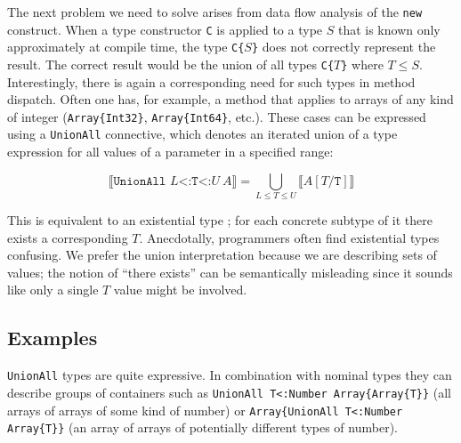 The next problem we need to solve arises from data flow analysis of
the \texttt{new} construct.
When a type constructor \texttt{C} is applied to a type
$S$ that is known only approximately at compile time, the type \texttt{C\{}$S$\texttt{\}}
does not correctly represent the result.
The correct result would be the union of all types \texttt{C\{}$T$\texttt{\}}
where $T\leq S$.
Interestingly, there is again a corresponding need for such types in method
dispatch. Often one has, for example, a method that applies to arrays of any
kind of integer (\texttt{Array\{Int32\}}, \texttt{Array\{Int64\}}, etc.).
These cases can be expressed using a \texttt{UnionAll} connective, which denotes
an iterated union of a type expression for all values of a parameter in a specified
range:

\vspace{-3ex}
\[
  \llbracket \texttt{UnionAll }L\texttt{<:T<:}U\ A \rrbracket = \bigcup_{L \leq T \leq U} \llbracket A[T/\texttt{T}] \rrbracket
\]


This is equivalent to an existential type \cite{boundedquant};
for each concrete subtype of it there exists a corresponding $T$.
Anecdotally, programmers often find existential types confusing.
We prefer the union interpretation because we are describing sets of values;
the notion of ``there exists'' can be semantically misleading since it sounds like
only a single $T$ value might be involved.



\subsection{Examples}

\texttt{UnionAll} types are quite expressive. In combination with nominal
types they can describe groups of containers such as
\texttt{UnionAll T<:Number Array\{Array\{T\}\}} (all arrays of arrays of
some kind of number) or
\texttt{Array\{UnionAll T<:Number Array\{T\}\}} (an array of arrays of
potentially different types of number).

